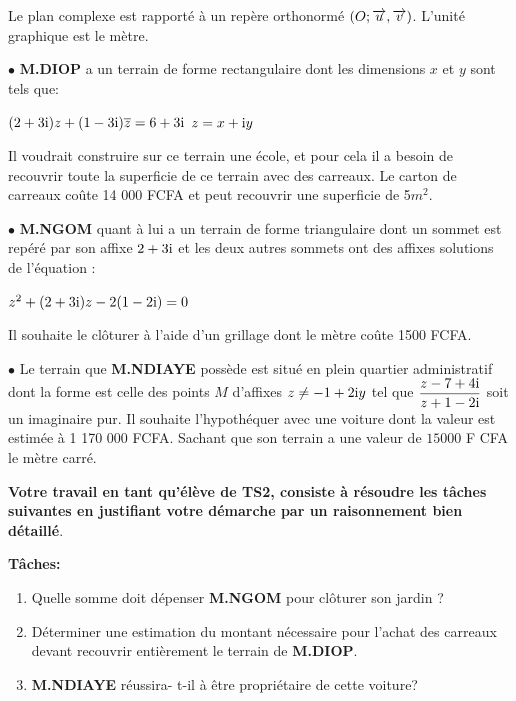 \begin{exercice}
Le plan complexe est rapporté à un repère  orthonormé $ (O ;\overrightarrow{u},\overrightarrow{v}) $. L'unité graphique est le mètre.
\medskip

$ \bullet $  \textbf{M.DIOP} a un terrain de forme rectangulaire  dont les dimensions $x$ et $y$ sont tels que:
\medskip

\hspace*{3cm} $ (2+3\text{i})z+(1-3\text{i})\overline{z} =6+3\text{i}$  \qquad  $ z=x+\text{i} y $ 

\medskip

\noindent Il voudrait construire sur ce terrain une école, et pour cela il a besoin de recouvrir  toute la superficie de ce terrain avec des carreaux. Le carton de carreaux coûte 14 000 FCFA et peut recouvrir une superficie de 5$m^2$.


\medskip


$ \bullet $  \textbf{M.NGOM} quant à lui  a un terrain de forme triangulaire  dont un sommet est repéré par son affixe  $ 2+3\text{i} $ et les deux autres  sommets  ont des affixes   solutions de l'équation :

\medskip
\hspace*{3cm}  $ z^2 + (2+3\text{i})z -2(1-2\text{i})=0$

\medskip
\noindent Il souhaite le clôturer à l'aide d'un grillage dont le mètre coûte 1500 FCFA.

\medskip

$ \bullet $ Le terrain que  \textbf{M.NDIAYE}  possède est situé en plein  quartier administratif  dont la forme est celle des points $ M $ d'affixes $ z\neq -1+2\text{i} y $ tel que \; $ \dfrac{z-7+4\text{i}}{z+1-2\text{i}}$ soit un imaginaire pur. Il souhaite l'hypothéquer  avec une voiture dont la valeur est estimée à 1 170 000 FCFA. Sachant que son terrain a une valeur de $ 15000$  F CFA le mètre carré.

\medskip

\textbf{Votre travail en tant qu'élève de TS2, consiste à résoudre les tâches suivantes en justifiant votre démarche par un raisonnement bien détaillé}.

\medskip

\textbf{Tâches:}
\begin{enumerate}
\item Quelle somme doit dépenser  \textbf{M.NGOM} pour clôturer son jardin ?
\item Déterminer une estimation du montant nécessaire pour l'achat des carreaux devant recouvrir entièrement le terrain de  \textbf{M.DIOP}.
\item \textbf{M.NDIAYE}  réussira- t-il à être propriétaire de cette voiture? 
\end{enumerate}
\end{exercice}
